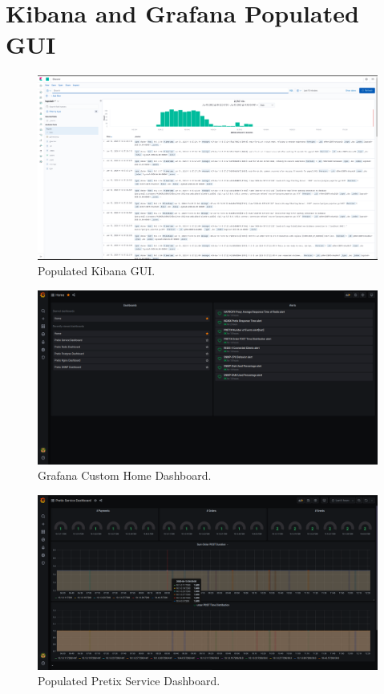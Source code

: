 \documentclass[12pt]{article}
\begin{document}
\clearpage


\appendix
\section{Kibana and Grafana Populated GUI}

\begin{figure}[H]
  \includegraphics[width=\linewidth]{images/kibana.png}
  \caption{Populated Kibana GUI.}
  \label{fig:kibana}
\end{figure}

\begin{figure}[H]
  \includegraphics[width=\linewidth]{images/home.png}
  \caption{Grafana Custom Home Dashboard.}
  \label{fig:home}
\end{figure}

\begin{figure}[H]
  \includegraphics[width=\linewidth]{images/pretixServiceDashboard.png}
  \caption{Populated Pretix Service Dashboard.}
  \label{fig:pretix}
\end{figure}
\end{document}
